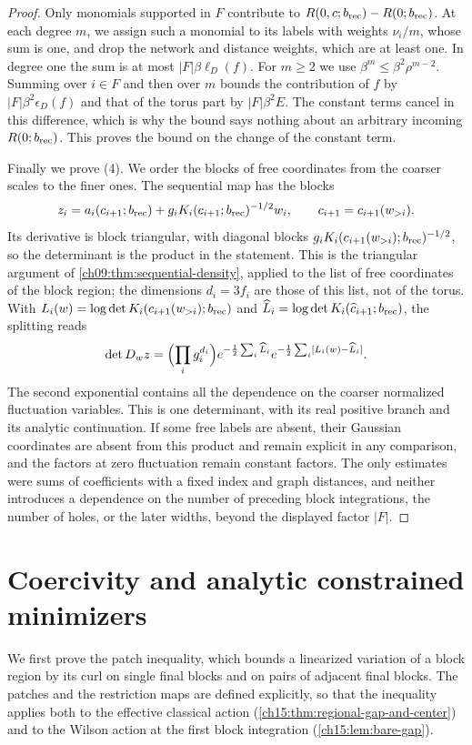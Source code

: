 \begin{proof}
Only monomials supported in $F$ contribute to $R(0,c;b_{\mathrm{rec}})-R(0;b_{\mathrm{rec}})$. At each degree $m$, we assign such a monomial to its labels with weights $\nu_i/m$, whose sum is one, and drop the network and distance weights, which are at least one. In degree one the sum is at most $|F|\beta\ell_D(f)$. For $m\ge2$ we use $\beta^m\le\beta^2\rho^{m-2}$. Summing over $i\in F$ and then over $m$ bounds the contribution of $f$ by $|F|\beta^2\epsilon_D(f)$ and that of the torus part by $|F|\beta^2E$. The constant terms cancel in this difference, which is why the bound says nothing about an arbitrary incoming $R(0;b_{\mathrm{rec}})$. This proves the bound on the change of the constant term.

Finally we prove (4). We order the blocks of free coordinates from the coarser scales to the finer ones. The sequential map has the blocks
\[
 z_i=a_i(c_{i+1};b_{\mathrm{rec}})+
         g_i K_i(c_{i+1};b_{\mathrm{rec}})^{-1/2}w_i,
 \qquad c_{i+1}=c_{i+1}(w_{>i}).
\]
Its derivative is block triangular, with diagonal blocks $g_iK_i(c_{i+1}(w_{>i});b_{\mathrm{rec}})^{-1/2}$, so the determinant is the product in the statement. This is the triangular argument of \cref{ch09:thm:sequential-density}, applied to the list of free coordinates of the block region; the dimensions $d_i=3f_i$ are those of this list, not of the torus. With $L_i(w)=\log\det K_i(c_{i+1}(w_{>i});b_{\mathrm{rec}})$ and $\widehat L_i=\log\det K_i(\widehat c_{i+1};b_{\mathrm{rec}})$, the splitting reads
\[
 \det D_wz
  =\Bigl(\prod_i g_i^{d_i}\Bigr)
       e^{-\frac12\sum_i\widehat L_i}
       e^{-\frac12\sum_i[L_i(w)-\widehat L_i]} .
\]
The second exponential contains all the dependence on the coarser normalized fluctuation variables. This is one determinant, with its real positive branch and its analytic continuation. If some free labels are absent, their Gaussian coordinates are absent from this product and remain explicit in any comparison, and the factors at zero fluctuation remain constant factors. The only estimates were sums of coefficients with a fixed index and graph distances, and neither introduces a dependence on the number of preceding block integrations, the number of holes, or the later widths, beyond the displayed factor $|F|$.
\end{proof}

\section{Coercivity and analytic constrained minimizers}\label{ch15:sec:gap}

We first prove the patch inequality, which bounds a linearized variation of a block region by its curl on single final blocks and on pairs of adjacent final blocks. The patches and the restriction maps are defined explicitly, so that the inequality applies both to the effective classical action (\cref{ch15:thm:regional-gap-and-center}) and to the Wilson action at the first block integration (\cref{ch15:lem:bare-gap}).


